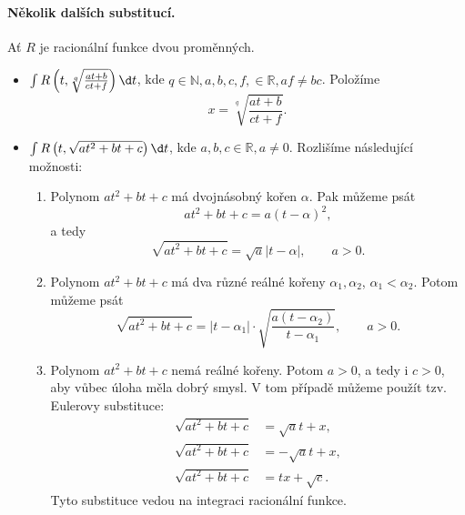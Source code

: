 \paragraph{Několik dalších substitucí.} Ať $R$ je racionální funkce dvou proměnných.
\begin{itemize}
	\item $\int R \left( t, \sqrt[q]{\frac{at+b}{ct+f}} \right ) \d t$, kde $q \in \mathbb N , a,b,c,f,\in \mathbb R , af \ne bc$.
	Položíme
	$$
	    x = \sqrt[q]{\frac{at+b}{ct+f}}.
	$$
	\item $\int R \left( t, \sqrt{at^2 + bt +c} \right )\d t $, kde $a,b,c \in \mathbb R , a \ne 0$.
	Rozlišíme následující možnosti:
	\begin{enumerate}[(1)]
		\item Polynom $at^2+bt+c$ má dvojnásobný kořen $\alpha$. Pak můžeme psát
		$$
		    at^2+bt+c = a(t-\alpha)^2,
		$$
		a tedy
		$$
  \sqrt{at^2+bt+c}= \sqrt{a} |t-\alpha|, \qquad a > 0.
		$$
		\item Polynom $at^2+bt+c$ má dva různé reálné kořeny $\alpha_1, \alpha_2$, $\alpha_1 <\alpha_2$.
		Potom můžeme psát
		$$
  \sqrt{at^2+bt+c} = |t-\alpha_1| \cdot \sqrt{\frac{a(t-\alpha_2)}{t-\alpha_1}}, \qquad a>0.
		$$
		\item Polynom $at^2+bt+c$ nemá reálné kořeny. Potom $a>0$, a tedy i $c>0$, aby vůbec
		úloha měla dobrý smysl. V tom případě můžeme použít tzv. Eulerovy substituce:
		\begin{align*}
			\sqrt{at^2+bt+c} &= \sqrt{a}t +x, \\
			\sqrt{at^2+bt+c} &= -\sqrt{a}t+x, \\
			\sqrt{at^2+bt+c} &= tx+ \sqrt{c}.
		\end{align*}
		Tyto substituce vedou na integraci racionální funkce.
	\end{enumerate}
\end{itemize}

